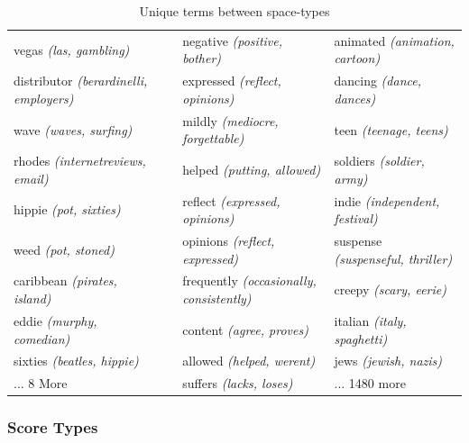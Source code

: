 \begin{landscape}
\begin{table}[]
\begin{tabular}{llll}
			vegas \textit{(las, gambling)}                 &                          & negative \textit{(positive, bother)}             & animated \textit{(animation, cartoon)}           \\
			distributor \textit{(berardinelli, employers)} &                          & expressed \textit{(reflect, opinions)}           & dancing \textit{(dance, dances)}                 \\
			wave \textit{(waves, surfing)}                 &                          & mildly \textit{(mediocre, forgettable)}          & teen \textit{(teenage, teens)}                   \\
			rhodes \textit{(internetreviews, email)}       &                          & helped \textit{(putting, allowed)}               & soldiers \textit{(soldier, army)}                \\
			hippie \textit{(pot, sixties)}                 &                          & reflect \textit{(expressed, opinions)}           & indie \textit{(independent, festival)}           \\
			weed \textit{(pot, stoned)}                    &                          & opinions \textit{(reflect, expressed)}           & suspense \textit{(suspenseful, thriller)}        \\
			caribbean \textit{(pirates, island)}           &                          & frequently \textit{(occasionally, consistently)} & creepy \textit{(scary, eerie)}                   \\
			eddie \textit{(murphy, comedian)}              &                          & content \textit{(agree, proves)}                 & italian \textit{(italy, spaghetti)}              \\
			sixties \textit{(beatles, hippie)}             &                          & allowed \textit{(helped, werent)}                & jews \textit{(jewish, nazis)}                    \\
			... 8 More                   		  &                          & suffers \textit{(lacks, loses)}                  & ... 1480 more               
		\end{tabular}
		\caption{Unique terms between space-types}\label{ch3:ComparingSpaceTypes}
	\end{table}
\end{landscape}

\subsubsection{Score Types}

